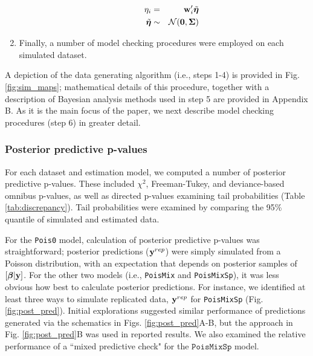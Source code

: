 \documentclass[12pt,english]{article}
\begin{document}
\begin{spacing}{1.9}
\begin{enumerate}
\begin{itemize}
\begin{eqnarray*}
           \eta_i & = & {\bf w}_i^\prime \tilde{\boldsymbol{\eta}} \\
           \tilde{\boldsymbol{\eta}} & \sim & \mathcal{N}(\textbf{0},\boldsymbol{\Sigma}) \\
          \end{eqnarray*}
      \end{itemize}
  \item Finally, a number of model checking procedures were employed on each simulated dataset.
\end{enumerate}
A depiction of the data generating algorithm (i.e., steps 1-4) is provided in Fig. \ref{fig:sim_maps}; mathematical details of this procedure, together with a description of Bayesian analysis methods used in step 5 are provided in Appendix B.  As it is the main focus of the paper, we next describe model checking procedures (step 6) in greater detail.

\subsubsection{Posterior predictive p-values}

For each dataset and estimation model, we computed a number of posterior predictive p-values.  These included $\chi^2$, Freeman-Tukey, and deviance-based omnibus p-values, as well as directed p-values examining tail probabilities (Table \ref{tab:discrepancy}). Tail probabilities were examined by comparing the 95\% quantile of simulated and estimated data.

For the \texttt{Pois0} model, calculation of posterior predictive p-values was straightforward; posterior predictions (${\bf y}^{rep}$) were simply simulated from a Poisson distribution, with an expectation that depends on posterior samples of $[\boldsymbol{\beta}|{\bf y}]$.  For the other two models (i.e., \texttt{PoisMix} and \texttt{PoisMixSp}), it was less obvious how best to calculate posterior predictions.  For instance, we identified at least three ways to simulate replicated data, ${\bf y}^{rep}$ for \texttt{PoisMixSp} (Fig. \ref{fig:post_pred}).  Initial explorations suggested similar performance of predictions generated via the schematics in Figs. \ref{fig:post_pred}A-B, but the approach in Fig. \ref{fig:post_pred}B was used in reported results.  We also examined the relative performance of a ``mixed predictive check" \citep[][; Fig. \ref{fig:post_pred}C]{MarshallSpiegelhalter2007} for the $\texttt{PoisMixSp}$ model.


\end{spacing}
\end{document}
